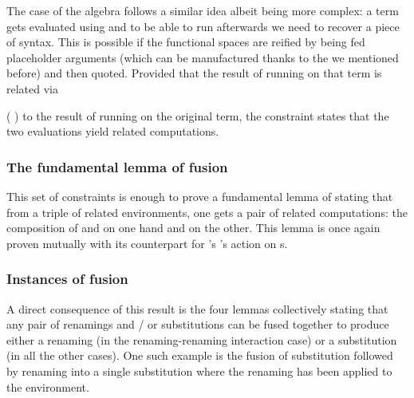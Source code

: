 \begin{agdasnippet}
\addtolength{\leftskip}{\parindent}
\end{agdasnippet}
The case of the algebra follows a similar idea albeit being more complex:
a term gets evaluated using  and to be able to run 
afterwards we need to recover a piece of syntax. This is possible if the
 functional spaces are reified by being fed placeholder  arguments
(which can be manufactured thanks to the  we mentioned before) and
then quoted. Provided that the result of running  on that term is
related via {   (  ) to the result
of running  on the original term, the  constraint states
that the two evaluations yield related computations.

\begin{agdasnippet}
\addtolength{\leftskip}{\parindent}
\end{agdasnippet}

\subsubsection{The fundamental lemma of fusion}

This set of constraints is enough to prove a fundamental lemma of 
stating that from a triple of related environments, one gets a pair of related
computations: the composition of  and  on one hand and
 on the other. This lemma is once again proven mutually with its
counterpart for \semrec{}'s 's action on s.

\begin{agdasnippet}
\end{agdasnippet}

\subsubsection{Instances of fusion}

A direct consequence of this result is the four lemmas collectively stating
that any pair of renamings and / or substitutions can be fused together to
produce either a renaming (in the renaming-renaming interaction case) or a
substitution (in all the other cases). One such example is the fusion of
substitution followed by renaming into a single substitution where the
renaming has been applied to the environment.

}
